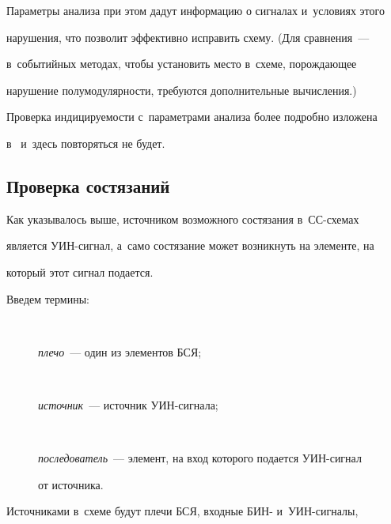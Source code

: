 Параметры анализа при этом дадут информацию о сигналах и~условиях этого 


нарушения, что позволит эффективно исправить схему. (Для сравнения~--- 


в~событийных методах, чтобы установить место в~схеме, порождающее 


нарушение полумодулярности, требуются дополнительные вычисления.)


   


   Проверка индицируемости с~параметрами анализа более подробно изложена 


в~\cite{8-pl} и~здесь повторяться не будет.





\subsection{Проверка состязаний}


       


   Как указывалось выше, источником возможного состязания в~СС-схе\-мах 


является УИН-сигнал, а~само состязание может возникнуть на элементе, на 


который этот сигнал подается.


   


   Введем термины:


   \begin{description}


\item [\,]    \textit{плечо}~--- один из элементов БСЯ;


   


\item[\,]     \textit{источник}~--- источник УИН-сигнала;


   


\item[\,]     \textit{последователь}~--- элемент, на вход которого подается УИН-сигнал 


от источ\-ника.


   \end{description}


   


   Источниками в~схеме будут плечи БСЯ, входные БИН- и~УИН-сигналы, 


